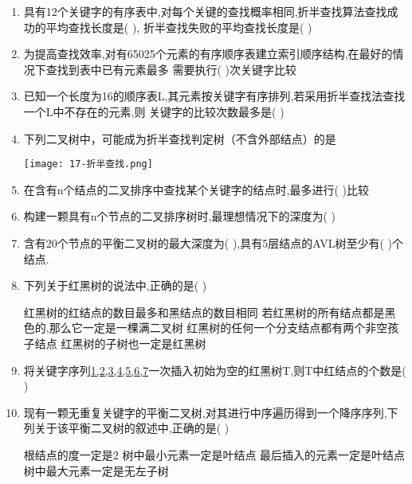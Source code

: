 \documentclass[12pt, a4paper, oneside, UTF8]{ctexbook}
\begin{document}
\begin{enumerate}
    \item 具有12个关键字的有序表中,对每个关键的查找概率相同,折半查找算法查找成功的平均查找长度是(   ),
    折半查找失败的平均查找长度是(    ) 


    \item 为提高查找效率,对有65025个元素的有序顺序表建立索引顺序结构,在最好的情况下查找到表中已有元素最多
    需要执行(   )次关键字比较 
    

    \item \bl 已知一个长度为16的顺序表L,其元素按关键字有序排列,若采用折半查找法查找一个L中不存在的元素,则
    关键字的比较次数最多是(    ) 



    \item \bl 下列二叉树中，可能成为折半查找判定树（不含外部结点）的是
    \begin{center}
    \texttt{[image: 17-折半查找.png]}
    \end{center}


    
    \item 在含有n个结点的二叉排序中查找某个关键字的结点时,最多进行(   )比较 

    \item 构建一颗具有n个节点的二叉排序树时,最理想情况下的深度为(   )

    \item 含有20个节点的平衡二叉树的最大深度为(   ),具有5层结点的AVL树至少有(   )个结点.

    \item 下列关于红黑树的说法中,正确的是(   ) 
    \begin{choices}[1]
        \task 红黑树的红结点的数目最多和黑结点的数目相同
        \task 若红黑树的所有结点都是黑色的,那么它一定是一棵满二叉树
        \task 红黑树的任何一个分支结点都有两个非空孩子结点
        \task 红黑树的子树也一定是红黑树
    \end{choices}

    \item \bt 将关键字序列\underline{1,2,3,4,5,6,7}一次插入初始为空的红黑树T,则T中红结点的个数是(    ) 

    \item \bl 现有一颗无重复关键字的平衡二叉树,对其进行中序遍历得到一个降序序列,下列关于该平衡二叉树的叙述中,正确的是(  ) 
    \begin{choices}[2]
        \task 根结点的度一定是2
        \task 树中最小元素一定是叶结点
        \task 最后插入的元素一定是叶结点
        \task 树中最大元素一定是无左子树
    \end{choices}


\end{enumerate}
\end{document}
